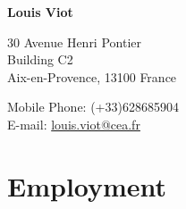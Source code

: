 \documentclass{article}
\begin{document}
{\huge \bf Louis Viot}\\
\bigskip
\begin{minipage}[t]{0.5\textwidth}
	30 Avenue Henri Pontier \\
    Building C2 \\
    Aix-en-Provence, 13100 France
\end{minipage}
\begin{minipage}[]{0.5\textwidth}
\begin{flushright}
	Mobile Phone: (+33)628685904 \\
	E-mail: \href{mailto:louis.viot@cea.fr}{louis.viot@cea.fr} \\
\end{flushright}
\end{minipage}

\section*{Employment}
\end{document}
